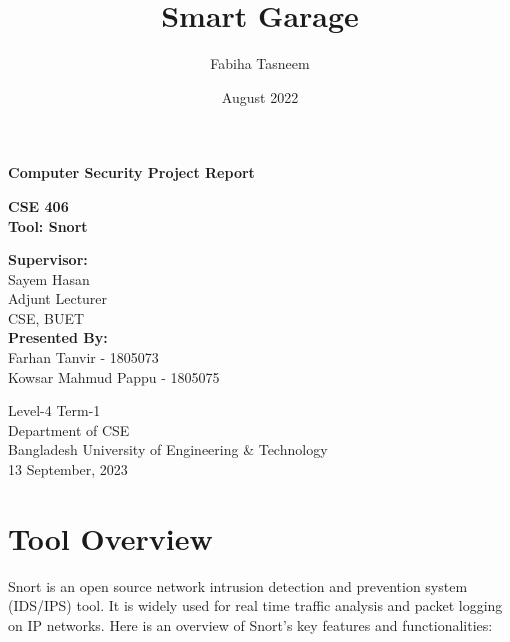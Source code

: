 \documentclass[12pt, A4Paper]{article}
\title{Smart Garage}
\author{Fabiha Tasneem }
\date{August 2022}
\begin{document}
\begin{titlepage}
   \begin{center}

       \LARGE{\textbf{Computer Security Project Report}}

       \vspace{1cm}
       \Large{\textbf{CSE 406}}\\
       \vspace{0.5cm}
       \large{\textbf {Tool: Snort}}
       
        \vspace{2cm}
    \textbf{Supervisor:}\\
       Sayem Hasan\\
       Adjunt Lecturer\\
       CSE, BUET\\
       
       
      \vspace{3cm}
    \textbf{Presented By:}\\
       Farhan Tanvir - 1805073\\
       Kowsar Mahmud Pappu - 1805075
            
       \vspace{2cm}
        Level-4 Term-1\\
        Department of CSE\\
       Bangladesh University of Engineering \& Technology\\
       13 September, 2023\\
            
   \end{center}
\end{titlepage}

\section{Tool Overview}
Snort is an open source network intrusion detection and prevention system (IDS/IPS) tool. It is widely used for real time traffic analysis and packet logging on IP networks. Here is an overview of Snort's key features and functionalities:
\end{document}
